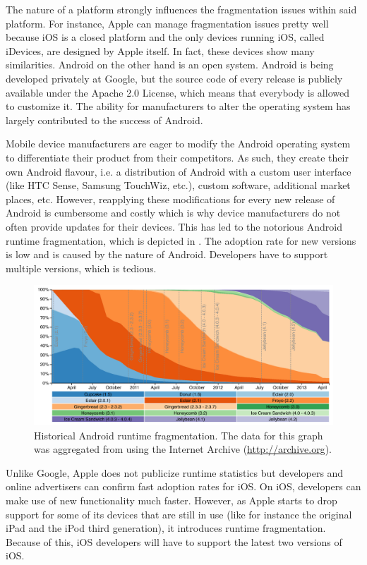 The nature of a platform strongly influences the fragmentation issues within said platform. For instance, Apple can manage fragmentation issues pretty well because iOS is a closed platform and the only devices running iOS, called iDevices, are designed by Apple itself. In fact, these devices show many similarities. Android on the other hand is an open system. Android is being developed privately at Google, but the source code of every release is publicly available under the Apache 2.0 License, which means that everybody is allowed to customize it. The ability for manufacturers to alter the operating system has largely contributed to the success of Android. 

Mobile device manufacturers are eager to modify the Android operating system to differentiate their product from their competitors. As such, they create their own Android flavour, i.e. a distribution of Android with a custom user interface (like HTC Sense, Samsung TouchWiz, etc.), custom software, additional market places, etc. However, reapplying these modifications for every new release of Android is cumbersome and costly which is why device manufacturers do not often provide updates for their devices. This has led to the notorious Android runtime fragmentation, which is depicted in . The adoption rate for new versions is low and is caused by the nature of Android. Developers have to support multiple versions, which is tedious. 

\begin{figure}[h]
    \centering
    \includegraphics[width=\textwidth]{../resources/figs/android_runtimes.pdf}
    \caption{Historical Android runtime fragmentation. The data for this graph was aggregated from \cite{Android:Versions} using the Internet Archive (\url{http://archive.org}).}
    \label{fig:android_runtimes}
\end{figure}

Unlike Google, Apple does not publicize runtime statistics but developers \cite{Smith:2013} and online advertisers \cite{Chitika:2013} can confirm fast adoption rates for iOS. On iOS, developers can make use of new functionality much faster. However, as Apple starts to drop support for some of its devices that are still in use (like for instance the original iPad and the iPod third generation), it introduces runtime fragmentation. Because of this, iOS developers will have to support the latest two versions of iOS.

